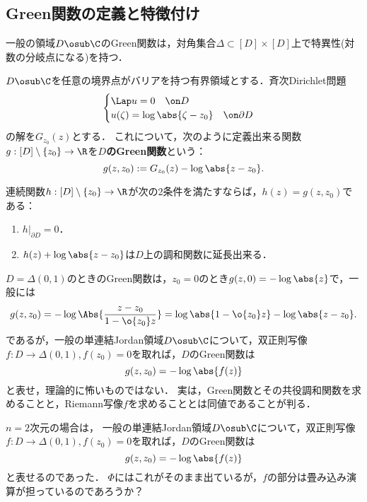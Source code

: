 \documentclass[uplatex,dvipdfmx]{jsreport}
\begin{document}
\subsection{Green関数の定義と特徴付け}

\begin{tcolorbox}[colframe=ForestGreen, colback=ForestGreen!10!white,breakable,colbacktitle=ForestGreen!40!white,coltitle=black,fonttitle=\bfseries\sffamily,
title=]
    一般の領域$D\osub\C$のGreen関数は，対角集合$\Delta\subset[D]\times[D]$上で特異性(対数の分岐点になる)を持つ．
\end{tcolorbox}

\begin{definition}
    $D\osub\C$を任意の境界点がバリアを持つ有界領域とする．斉次Dirichlet問題
    \[\begin{cases}
        \Lap u=0\quad\on D\\
        u(\zeta)=\log\abs{\zeta-z_0}\quad\on\partial D
    \end{cases}\]
    の解を$G_{z_0}(z)$とする．
    これについて，次のように定義出来る関数$g:[D]\setminus\{z_0\}\to\R$を\textbf{$D$のGreen関数}という：
    \[g(z,z_0):=G_{z_0}(z)-\log\abs{z-z_0}.\]
\end{definition}

\begin{proposition}
    連続関数$h:[D]\setminus\{z_0\}\to\R$が次の2条件を満たすならば，$h(z)=g(z,z_0)$である：
    \begin{enumerate}
        \item $h|_{\partial D}=0$．
        \item $h(z)+\log\abs{z-z_0}$は$D$上の調和関数に延長出来る．
    \end{enumerate}
\end{proposition}

\begin{example}
    $D=\Delta(0,1)$のときのGreen関数は，$z_0=0$のとき$g(z,0)=-\log\abs{z}$で，一般には
    \[g(z,z_0)=-\log\Abs{\frac{z-z_0}{1-\o{z_0}z}}=\log\abs{1-\o{z_0}z}-\log\abs{z-z_0}.\]
    であるが，一般の単連結Jordan領域$D\osub\C$について，双正則写像$f:D\to\Delta(0,1),f(z_0)=0$を取れば，$D$のGreen関数は
    \[g(z,z_0)=-\log\abs{f(z)}\]
    と表せ，理論的に怖いものではない．
    実は，Green関数とその共役調和関数を求めることと，Riemann写像$f$を求めることとは同値であることが判る．
\end{example}
\begin{remark}[基本解との関連について]
    $n=2$次元の場合は，
    一般の単連結Jordan領域$D\osub\C$について，双正則写像$f:D\to\Delta(0,1),f(z_0)=0$を取れば，$D$のGreen関数は
    \[g(z,z_0)=-\log\abs{f(z)}\]
    と表せるのであった．
    $\Phi$にはこれがそのまま出ているが，$f$の部分は畳み込み演算が担っているのであろうか？
\end{remark}
\end{document}
